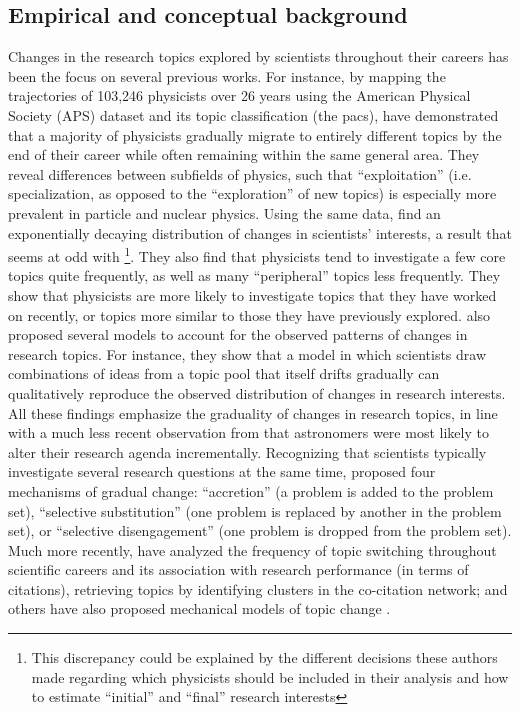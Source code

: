 \documentclass{article}
\begin{document}
\subsection{\label{sec:conceptual}Empirical and conceptual background}

Changes in the research topics explored by scientists throughout their careers has been the focus on several previous works. For instance, by mapping the trajectories of 103,246 physicists over 26 years using the American Physical Society (APS) dataset and its topic classification (the \gls{pacs}), \citet{Aleta2019} have demonstrated that a majority of physicists gradually migrate to entirely different topics by the end of their career while often remaining within the same general area. They reveal differences between subfields of physics, such that ``exploitation'' (i.e. specialization, as opposed to the ``exploration'' of new topics) is especially more prevalent in particle and nuclear physics.  Using the same data, \citet{Jia2017} find an exponentially decaying distribution of changes in scientists' interests, a result that seems at odd with \citealt{Aleta2019}\footnote{This discrepancy could be explained by the different decisions these authors made regarding which physicists should be included in their analysis and how to estimate ``initial'' and ``final'' research interests}. They also find that physicists tend to investigate a few core topics quite frequently, as well as many ``peripheral'' topics less frequently. They show that physicists are more likely to investigate topics that they have worked on recently, or topics more similar to those they have previously explored. \citet{Jia2017} also proposed several models to account for the observed patterns of changes in research topics. For instance, they show that a model in which scientists draw combinations of ideas from a topic pool that itself drifts gradually can qualitatively reproduce the observed distribution of changes in research interests. All these findings emphasize the graduality of changes in research topics, in line with a much less recent observation from \citet{Gieryn1978} that astronomers were most likely to alter their research agenda incrementally. Recognizing that scientists typically investigate several research questions at the same time, \citeauthor{Gieryn1978} proposed four mechanisms of gradual change: ``accretion'' (a problem is added to the problem set),  ``selective substitution'' (one problem is replaced by another in the problem set), or ``selective disengagement'' (one problem is dropped from the problem set). Much more recently, \citet{Zeng2019} have analyzed the frequency of topic switching throughout scientific careers and its association with research performance (in terms of citations), retrieving topics by identifying clusters in the co-citation network; and others have also proposed mechanical models of topic change \citep{Chakresh2023,Feifan2023}.
\end{document}
